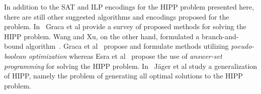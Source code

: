 \documentclass[12pt,a4paper]{article}
\begin{document}
In addition to the SAT and ILP encodings for the HIPP problem presented here, there are still other suggested algorithms and encodings proposed for the problem.
In~\cite{DBLP:journals/jcb/GracaLMO10} Graca et al provide a survey of proposed methods for solving the HIPP problem.
Wang and Xu, on the other hand, formulated a branch-and-bound algorithm~\cite{DBLP:journals/bioinformatics/WangX03a}.
Graca et al~\cite{DBLP:journals/anor/GracaMLO11} propose and formulate methods utilizing \emph{pseudo-boolean optimization} 
whereas Esra et al~\cite{DBLP:conf/lpnmr/ErdemET09} propose the use of \emph{answer-set programming} for solving the HIPP problem.
In~\cite{DBLP:journals/jda/JagerCZ16} Jäger et al study a generalization of HIPP, namely the problem of generating all optimal solutions to the HIPP problem.






\end{document}
